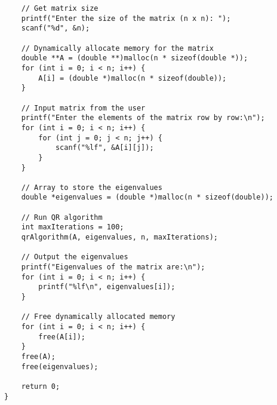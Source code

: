 \documentclass[journal]{IEEEtran}
\begin{document}
\begin{enumerate}
\begin{lstlisting}
    // Get matrix size
    printf("Enter the size of the matrix (n x n): ");
    scanf("%d", &n);

    // Dynamically allocate memory for the matrix
    double **A = (double **)malloc(n * sizeof(double *));
    for (int i = 0; i < n; i++) {
        A[i] = (double *)malloc(n * sizeof(double));
    }

    // Input matrix from the user
    printf("Enter the elements of the matrix row by row:\n");
    for (int i = 0; i < n; i++) {
        for (int j = 0; j < n; j++) {
            scanf("%lf", &A[i][j]);
        }
    }

    // Array to store the eigenvalues
    double *eigenvalues = (double *)malloc(n * sizeof(double));

    // Run QR algorithm
    int maxIterations = 100;
    qrAlgorithm(A, eigenvalues, n, maxIterations);

    // Output the eigenvalues
    printf("Eigenvalues of the matrix are:\n");
    for (int i = 0; i < n; i++) {
        printf("%lf\n", eigenvalues[i]);
    }

    // Free dynamically allocated memory
    for (int i = 0; i < n; i++) {
        free(A[i]);
    }
    free(A);
    free(eigenvalues);

    return 0;
}

\end{lstlisting}








\end{enumerate}
\end{document}
